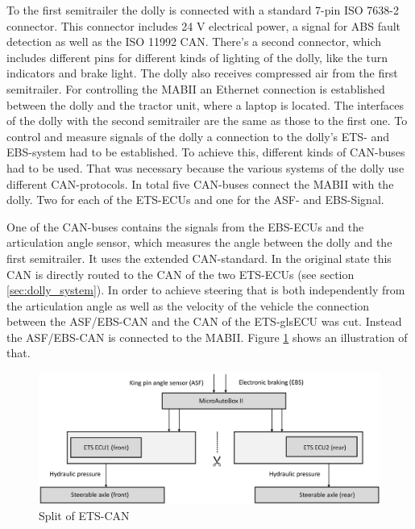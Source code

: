 \documentclass[ExampleMasters.tex]{subfiles}
\begin{document}
To the first semitrailer the dolly is connected with a standard 7-pin ISO 7638-2 connector. This connector includes 24 V electrical power, a signal for \gls{ABS} fault detection as well as the ISO 11992 CAN.
There's a second connector, which includes different pins for different kinds of lighting of the dolly, like the turn indicators and brake light.
The dolly also receives compressed air from the first semitrailer.
For controlling the \gls{MABII} an Ethernet connection is established between the dolly and the tractor unit, where a laptop is located. 
The interfaces of the dolly with the second semitrailer are the same as those to the first one.  
To control and measure signals of the dolly a connection to the dolly's \gls{ETS}- and \gls{EBS}-system had to be established. To achieve this, different kinds of \gls{CAN}-buses had to be used. That was necessary because the various systems of the dolly use different CAN-protocols. In total five \gls{CAN}-buses connect the \gls{MABII} with the dolly. Two for each of the \gls{ETS}-\gls{ECU}s and one for the \gls{ASF}- and \gls{EBS}-Signal.


One of the \gls{CAN}-buses contains the signals from the EBS-ECUs and the articulation angle sensor, which measures the angle between the dolly and the first semitrailer. It uses the extended CAN-standard. In the original state this \gls{CAN} is directly routed to the \gls{CAN} of the two \gls{ETS}-\gls{ECU}s (see section \ref{sec:dolly_system}). In order to achieve steering that is both independently from the articulation angle as well as the velocity of the vehicle the connection between the \gls{ASF}/\gls{EBS}-\gls{CAN} and the \gls{CAN} of the \gls{ETS}-gls{ECU} was cut. Instead the ASF/EBS-\gls{CAN} is connected to the \gls{MABII}. Figure \ref{fig:dolly_split} shows an illustration of that.\\

\begin{figure}[!htb]
	\centering
	\includegraphics[width=1\linewidth]{figures/dolly_split}
	\caption{Split of \gls{ETS}-\gls{CAN}}
	\label{fig:dolly_split}
\end{figure}  
\end{document}
